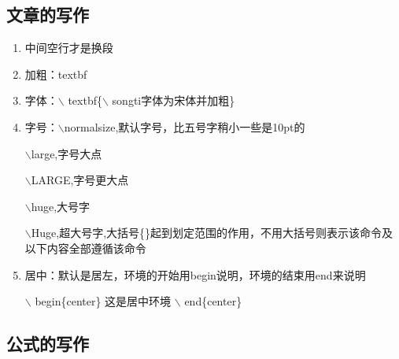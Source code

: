\documentclass[UTF8]{ctexart}
\begin{document}
    \subsection{文章的写作}

    \begin{enumerate}
    	\item 中间空行才是换段
    	
    	\item 加粗：textbf
    	
    	\item 字体：$\backslash$ textbf\{$\backslash$ songti字体为宋体并加粗\}
    	
    	\item 字号：$\backslash$normalsize,默认字号，比五号字稍小一些是10pt的
    	
    	$\backslash$large,字号大点
    	
    	$\backslash$LARGE,字号更大点
    	
    	$\backslash$huge,大号字
    	
    	$\backslash$Huge,超大号字,大括号\{\}起到划定范围的作用，不用大括号则表示该命令及以下内容全部遵循该命令
    	
    	\item 居中：默认是居左，环境的开始用begin说明，环境的结束用end来说明
    	
    	$\backslash$ begin\{center\}
    		这是居中环境
    	$\backslash$ end\{center\}
    \end{enumerate}
    \subsection{公式的写作}
\end{document}

